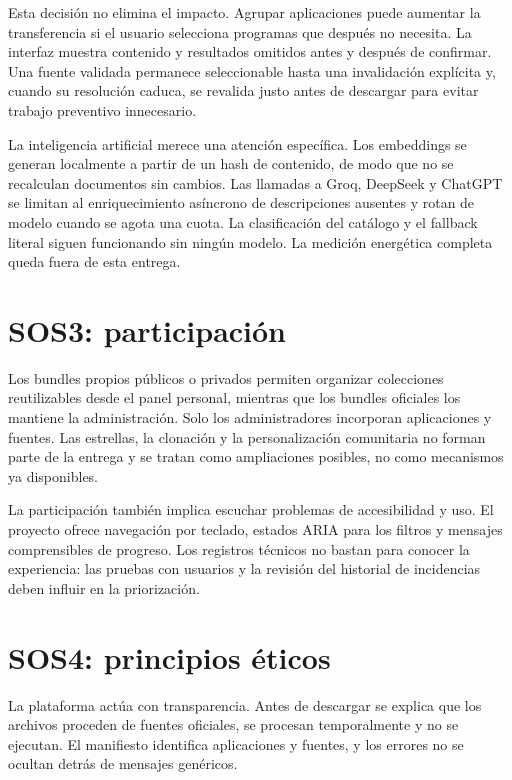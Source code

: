 Esta decisión no elimina el impacto. Agrupar aplicaciones puede aumentar la transferencia si el usuario selecciona programas que después no necesita. La interfaz muestra contenido y resultados omitidos antes y después de confirmar. Una fuente validada permanece seleccionable hasta una invalidación explícita y, cuando su resolución caduca, se revalida justo antes de descargar para evitar trabajo preventivo innecesario.

La inteligencia artificial merece una atención específica. Los embeddings se generan localmente a partir de un hash de contenido, de modo que no se recalculan documentos sin cambios. Las llamadas a Groq, DeepSeek y ChatGPT se limitan al enriquecimiento asíncrono de descripciones ausentes y rotan de modelo cuando se agota una cuota. La clasificación del catálogo y el fallback literal siguen funcionando sin ningún modelo. La medición energética completa queda fuera de esta entrega.

\section{SOS3: participación}

Los bundles propios públicos o privados permiten organizar colecciones reutilizables desde el panel personal, mientras que los bundles oficiales los mantiene la administración. Solo los administradores incorporan aplicaciones y fuentes. Las estrellas, la clonación y la personalización comunitaria no forman parte de la entrega y se tratan como ampliaciones posibles, no como mecanismos ya disponibles.

La participación también implica escuchar problemas de accesibilidad y uso. El proyecto ofrece navegación por teclado, estados ARIA para los filtros y mensajes comprensibles de progreso. Los registros técnicos no bastan para conocer la experiencia: las pruebas con usuarios y la revisión del historial de incidencias deben influir en la priorización.

\section{SOS4: principios éticos}

La plataforma actúa con transparencia. Antes de descargar se explica que los archivos proceden de fuentes oficiales, se procesan temporalmente y no se ejecutan. El manifiesto identifica aplicaciones y fuentes, y los errores no se ocultan detrás de mensajes genéricos.

